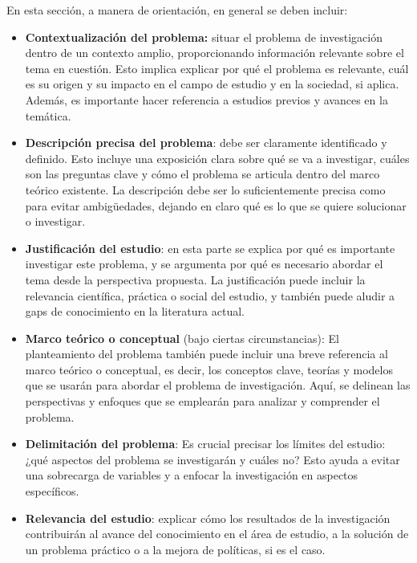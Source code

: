 \documentclass[a4paper,12pt]{article}
\begin{document}
	En esta sección, a manera de orientación, en general se deben incluir:
		\begin{itemize}
			\item \textbf{Contextualización del problema:} situar el problema de investigación dentro de un contexto amplio, proporcionando información relevante sobre el tema en cuestión. Esto implica explicar por qué el problema es relevante, cuál es su origen y su impacto en el campo de estudio y en la sociedad, si aplica. Además, es importante hacer referencia a estudios previos y avances en la temática.
		\end{itemize}
		\begin{itemize}
			\item \textbf{Descripción precisa del problema}: debe ser claramente identificado y definido. Esto incluye una exposición clara sobre qué se va a investigar, cuáles son las preguntas clave y cómo el problema se articula dentro del marco teórico existente. La descripción debe ser lo suficientemente precisa como para evitar ambigüedades, dejando en claro qué es lo que se quiere solucionar o investigar.
		\end{itemize}
		\begin{itemize}
			\item \textbf{Justificación del estudio}: en esta parte se explica por qué es importante investigar este problema, y se argumenta por qué es necesario abordar el tema desde la perspectiva propuesta. La justificación puede incluir la relevancia científica, práctica o social del estudio, y también puede aludir a gaps de conocimiento en la literatura actual.
		\end{itemize}
		
		\begin{itemize}
			\item\textbf{ Marco teórico o conceptual }(bajo ciertas circunstancias): El planteamiento del problema también puede incluir una breve referencia al marco teórico o conceptual, es decir, los conceptos clave, teorías y modelos que se usarán para abordar el problema de investigación. Aquí, se delinean las perspectivas y enfoques que se emplearán para analizar y comprender el problema.
		\end{itemize}
		\begin{itemize}
			\item \textbf{Delimitación del problema}: Es crucial precisar los límites del estudio: ¿qué aspectos del problema se investigarán y cuáles no? Esto ayuda a evitar una sobrecarga de variables y a enfocar la investigación en aspectos específicos.
		\end{itemize}
		\begin{itemize}
			\item \textbf{Relevancia del estudio}: explicar cómo los resultados de la investigación contribuirán al avance del conocimiento en el área de estudio, a la solución de un problema práctico o a la mejora de políticas, si es el caso.
		\end{itemize}
		
\end{document}
